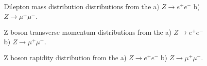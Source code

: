 \begin{figure}[h]
\begin{minipage}[h]{0.49\linewidth}
\end{minipage}
\hfill
\begin{minipage}[h]{0.49\linewidth}
\end{minipage}
\caption{Dilepton mass distribution distributions from the a) $Z\to e^{+}e^{-}$ b) $Z\to \mu^{+}\mu^{-}$.}
\label{fig:CPMassZ}
\end{figure}

\begin{figure}[h]
\begin{minipage}[h]{0.49\linewidth}
\end{minipage}
\hfill
\begin{minipage}[h]{0.49\linewidth}
\end{minipage}

\caption{ Z boson transverse momentum distributions from the a) $Z\to e^{+}e^{-}$ b) $Z\to \mu^{+}\mu^{-}$.}
\end{figure}


\begin{figure}[h]
\begin{minipage}[h]{0.49\linewidth}
\end{minipage}
\hfill
\begin{minipage}[h]{0.49\linewidth}
\end{minipage}

\caption{ Z boson rapidity distribution from the a) $Z\to e^{+}e^{-}$ b) $Z\to \mu^{+}\mu^{-}$.}
\label{ris:Zll2}
\end{figure}
